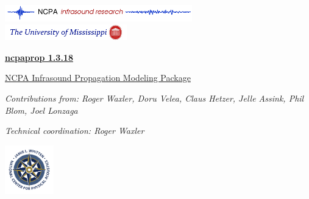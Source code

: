 \documentclass[10pt]{article}
\newcommand{\version}{1.3.18}
\begin{document}
\newpage

\vspace*{-50pt}
\includegraphics[width=230pt]{figs/logos/color_logo_UTTR.pdf}
\hspace*{65pt}
\includegraphics[width=150pt]{figs/logos/UM_logo.png}
\vspace*{50pt}


\vspace*{0.05\textheight}

\begin{center}

\begin{Huge} \underline{\textbf{ncpaprop \version}} \end{Huge} 

\vspace*{0.025\textheight} 

\begin{Large}
\underline{NCPA Infrasound Propagation Modeling Package}
\end{Large} 

\vspace*{0.06\textheight}

\textsl{Contributions from: Roger Waxler, Doru Velea, Claus Hetzer, Jelle Assink, Phil Blom, Joel Lonzaga}

\vspace*{0.02\textheight}

\textsl{Technical coordination: Roger Waxler}

\end{center}

\vspace*{0.06\textheight}

\begin{center}
\includegraphics[height=60pt]{figs/logos/NCPA-Logo-Crest.pdf}

\end{center}
\end{document}
